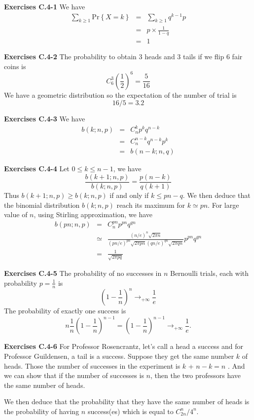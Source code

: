 \documentclass[a4paper,12pt]{article}
\newcommand{\newpar}[1]
{\bigskip \noindent \textbf{Exercises #1} \newline}
\newcommand{\ra}{\rightarrow}
\newcommand{\prob}[1]{\mathrm{Pr}\left\{ #1 \right\}}
\begin{document}
\newpar{C.4-1}
We have
\begin{eqnarray*}
  \sum_{k \ge 1}\prob{X=k} &=& \sum_{k \ge 1}q^{k-1}p \\
  &=& p\times \frac{1}{1-q} \\
  &=& 1
\end{eqnarray*}

\newpar{C.4-2}
The probability to obtain $3$ heads and $3$ tails if we flip $6$ fair
coins is
\[ C_6^3 \left(\frac{1}{2}\right)^6 = \frac{5}{16}\]
We have a geometric distribution so the expectation of the number of
trial is
\[16/5 = 3.2\]

\newpar{C.4-3}
We have
\begin{eqnarray*}
  b(k;n,p) &=& C_n^k p^k q^{n-k} \\
  &=& C_n^{n-k} q^{n-k} p^k \\
  &=& b(n-k; n, q)
\end{eqnarray*}

\newpar{C.4-4}
Let $0 \le k\le n-1$, we have
\[\frac{b(k+1;n,p)}{b(k;n,p)} = \frac{p(n-k)}{q(k+1)}\]
Thus $b(k+1;n,p) \ge b(k;n,p)$ if and only if $ k \le pn - q$.  We
then deduce that the binomial distribution $b(k;n,p)$ reach its
maximum for $k \simeq pn$.  For large value of $n$, using Stirling
approximation, we have
\begin{eqnarray*}
  b(pn;n,p) &=& C_n^{pn}p^{pn}q^{qn} \\
  &\simeq& \frac{(n/e)^n \sqrt{2\pi n}}
  {(pn/e)^{pn} \sqrt{2\pi pn} (qn/e)^{qn}\sqrt{2\pi qn}}
  p^{pn}q^{qn} \\
  &=& \frac{1}{\sqrt{2\pi pq}}
\end{eqnarray*}

\newpar{C.4-5}
The probability of no successes in $n$ Bernoulli trials, each with
probability $p = \frac{1}{n}$ is
\[ \left(1 - \frac{1}{n}\right)^n \rightarrow_{+\infty} \frac{1}{e}\]
The probability of exactly one success is
\[ n \frac{1}{n}\left(1-\frac{1}{n}\right)^{n-1} =
\left(1-\frac{1}{n}\right)^{n-1} \ra_{+\infty} \frac{1}{e}.\]

\newpar{C.4-6}
For Professor Rosencrantz, let's call a head a success and for
Professor Guildensen, a tail is a success.  Suppose they get the same
number $k$ of heads.  Those the number of successes in the experiment
is $k$ + $n-k = n$ .  And we can show that if the number of successes
is $n$, then the two professors have the same number of heads.

We then deduce that the probability that they have the same number of
heads is the probability of having $n$ success(es) which is equal to
$C_{2n}^n/4^n$.
\end{document}
